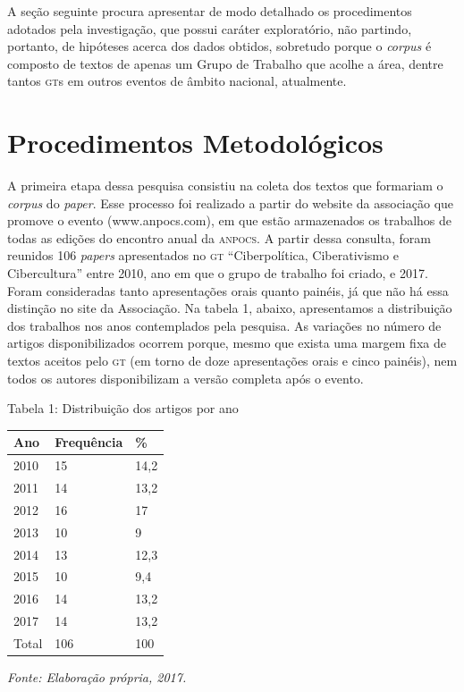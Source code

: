 A seção seguinte procura apresentar de modo detalhado os procedimentos
adotados pela investigação, que possui caráter exploratório, não
partindo, portanto, de hipóteses acerca dos dados obtidos, sobretudo
porque o \emph{corpus} é composto de textos de apenas um Grupo de
Trabalho que acolhe a área, dentre tantos \textsc{gt}s em outros eventos de
âmbito nacional, atualmente.

\section{Procedimentos Metodológicos}

\noindent{}A primeira etapa dessa pesquisa consistiu na coleta dos textos que
formariam o \emph{corpus} do \emph{paper}. Esse processo foi realizado a
partir do website da associação que promove o evento (www.anpocs.com),
em que estão armazenados os trabalhos de todas as edições do encontro
anual da \textsc{anpocs}. A partir dessa consulta, foram reunidos 106
\emph{papers} apresentados no \textsc{gt} ``Ciberpolítica, Ciberativismo e
Cibercultura'' entre 2010, ano em que o grupo de trabalho foi criado, e
2017. Foram consideradas tanto apresentações orais quanto painéis, já
que não há essa distinção no site da Associação. Na tabela 1, abaixo,
apresentamos a distribuição dos trabalhos nos anos contemplados pela
pesquisa. As variações no número de artigos disponibilizados ocorrem
porque, mesmo que exista uma margem fixa de textos aceitos pelo \textsc{gt} (em
torno de doze apresentações orais e cinco painéis), nem todos os
autores disponibilizam a versão completa após o evento.

\begin{center}
Tabela 1: Distribuição dos artigos por ano
\end{center}

\begin{center}
\centering
\begin{tabular}{|l|l|l|}
\hline
Ano & Frequência & \% \\ \hline
2010 & 15 & 14,2 \\ \hline
2011 & 14 & 13,2 \\ \hline
2012 & 16 & 17 \\ \hline
2013 & 10 & 9 \\ \hline
2014 & 13 & 12,3 \\ \hline
2015 & 10 & 9,4 \\ \hline
2016 & 14 & 13,2 \\ \hline
2017 & 14 & 13,2 \\ \hline
Total & 106 & 100 \\ \hline
\end{tabular}
\end{center}
\begin{center}
{\footnotesize\emph{Fonte: Elaboração própria, 2017.}}
\end{center}

